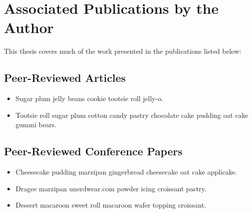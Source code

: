 \section{Associated Publications by the Author}

This thesis covers much of the work presented in the publications listed below:

\subsection{Peer-Reviewed Articles}
\renewcommand{\thefootnote}{\fnsymbol{footnote}}
\vspace{1em}
\begin{itemize}
\onehalfspacing
\item Sugar plum jelly beans cookie tootsie roll jelly-o.
\item Tootsie roll sugar plum cotton candy pastry chocolate cake pudding oat cake gummi bears.
\end{itemize}

\subsection{Peer-Reviewed Conference Papers}
\vspace{1em}
\begin{itemize}
\onehalfspacing
\item Cheesecake pudding marzipan gingerbread cheesecake oat cake applicake.
\item  Dragee marzipan unerdwear.com powder icing croissant pastry.
\item  Dessert macaroon sweet roll macaroon wafer topping croissant.

\end{itemize}

